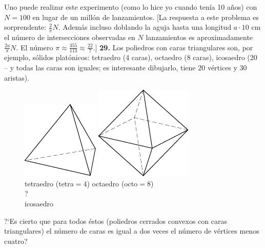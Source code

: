 \documentclass[12pt]{article}  %
\begin{document}
Uno puede realizar este experimento (como lo hice yo cuando ten\'{i}a 10 a\~nos) con $N=100$ en lugar de un mill\'on de lanzamientos.
[La respuesta a este problema es sorprendente: $\frac2{\pi}N$. Adem\'as incluso doblando la aguja hasta una longitud $a \cdot 10$
cm el n\'umero de intersecciones observadas en $N$ lanzamientos es aproximadamente $\frac{2a}{\pi}N$. 
El n\'umero $\pi \approx  \frac{355}{113} \approx \frac{22}7.$]
\newline\newline\quad
{\bf 29.} Los poliedros con caras triangulares son, por ejemplo, s\'olidos plat\'onicos: tetraedro (4 caras), octaedro (8 caras), icosaedro (20 -- y todas las caras son iguales; es interesante dibujarlo, tiene 20 v\'ertices y 30 aristas).
\begin{figure}[h!]
\centering
\footnotesize
\hspace{5pt}
\includegraphics[scale=1]{taskbook-131}\hspace{68pt}
\includegraphics[scale=1]{taskbook-132}\\ \vspace{3pt}
tetraedro (tetra${}= 4$) \hspace{40pt}
octaedro (octo${}= 8$)\\[25pt]
{\Huge 
?}\\ icosaedro\vspace{3pt}
\end{figure}
\newline\quad

?`Es cierto que para todos \'estos (poliedros cerrados convexos con caras triangulares) el n\'umero de caras es igual a dos veces el n\'umero de v\'ertices menos cuatro?
\end{document}
